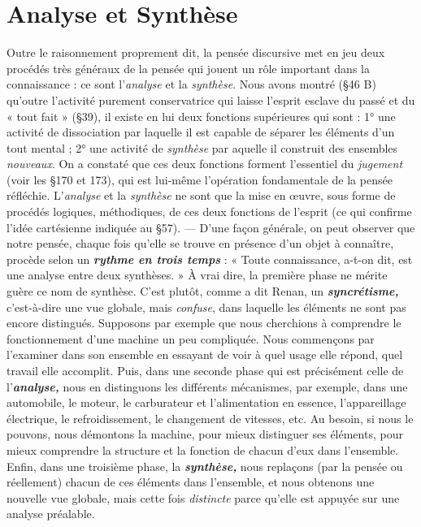 \section{Analyse et Synthèse}%
Outre le raisonnement proprement
dit, la pensée discursive met en jeu deux procédés très généraux
de la pensée qui jouent un rôle important dans la connaissance : ce
sont l'{\it analyse} et la {\it synthèse}. Nous avons montré (\S 46 B) qu’outre
l’activité purement conservatrice qui laisse l'esprit esclave du passé
et du « tout fait » (\S 39), il existe en lui deux fonctions supérieures
qui sont : 1° une activité de dissociation par laquelle il est capable de
séparer les éléments d’un tout mental ; 2° une activité de {\it synthèse} par
aquelle il construit des ensembles {\it nouveaux}. On a constaté que ces
deux fonctions forment l'essentiel du {\it jugement} (voir les \S 170 et 173),
qui est lui-même l'opération fondamentale de la pensée réfléchie.
L'{\it analyse} et la {\it synthèse} ne sont que la mise en œuvre, sous forme de
procédés logiques, méthodiques, de ces deux fonctions de l’esprit
(ce qui confirme l’idée cartésienne indiquée au \S 57). — D’une façon
générale, on peut observer que notre pensée, chaque fois qu’elle se
trouve en présence d’un objet à connaître, procède selon un \textbf{\textit {rythme
en trois temps}} : « Toute connaissance, a-t-on dit, est une analyse entre
deux synthèses. » À vrai dire, la première phase ne mérite guère ce
nom de synthèse. C’est plutôt, comme a dit Renan, un \textbf{\textit {syncrétisme,}}
c’est-à-dire une vue globale, mais {\it confuse}, dans laquelle les éléments
ne sont pas encore distingués. Supposons par exemple que nous cherchions
à comprendre le fonctionnement d’une machine un peu
compliquée. Nous commençons par l’examiner dans son ensemble en
essayant de voir à quel usage elle répond, quel travail elle accomplit.
Puis, dans une seconde phase qui est précisément celle de l’\textbf{\textit {analyse,}}
nous en distinguons les différents mécanismes, par exemple, dans une
automobile, le moteur, le carburateur et l’alimentation en essence,
l’appareillage électrique, le refroidissement, le changement de
vitesses, etc. Au besoin, si nous le pouvons, nous démontons la
machine, pour mieux distinguer ses éléments, pour mieux comprendre
la structure et la fonction de chacun d’eux dans l’ensemble. Enfin,
dans une troisième phase, la \textbf{\textit {synthèse,}} nous replaçons (par la pensée ou
réellement) chacun de ces éléments dans l’ensemble, et nous obtenons
une nouvelle vue globale, mais cette fois {\it distincte} parce qu’elle est
appuyée sur une analyse préalable.

